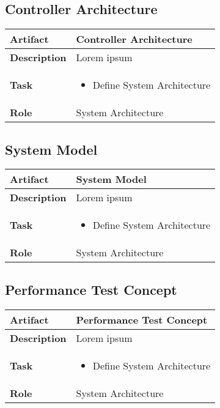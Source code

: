\subsection{Controller Architecture}
 \label{table:ch6_Artifact_Controller_Architecture}
\begin{tabular}
	{|m{2cm}|m{10cm}|} \hline \bfseries Artifact & Controller Architecture\\
	\hline \bfseries Description & Lorem ipsum\\
	\hline \bfseries Task & 
	\begin{itemize}
		\item Define System Architecture 
	\end{itemize}
	\\
	\hline \bfseries Role & System Architecture\\
	\hline 
\end{tabular}

\subsection{System Model}
 \label{table:ch6_Artifact_System_Model}
\begin{tabular}
	{|m{2cm}|m{10cm}|} \hline \bfseries Artifact & System Model\\
	\hline \bfseries Description & Lorem ipsum\\
	\hline \bfseries Task & 
	\begin{itemize}
		\item Define System Architecture 
	\end{itemize}
	\\
	\hline \bfseries Role & System Architecture\\
	\hline 
\end{tabular}

\subsection{Performance Test Concept}
 \label{table:ch6_Artifact_Performance_Test_Concept}
\begin{tabular}
	{|m{2cm}|m{10cm}|} \hline \bfseries Artifact & Performance Test Concept\\
	\hline \bfseries Description & Lorem ipsum\\
	\hline \bfseries Task & 
	\begin{itemize}
		\item Define System Architecture 
	\end{itemize}
	\\
	\hline \bfseries Role & System Architecture\\
	\hline 
\end{tabular}

